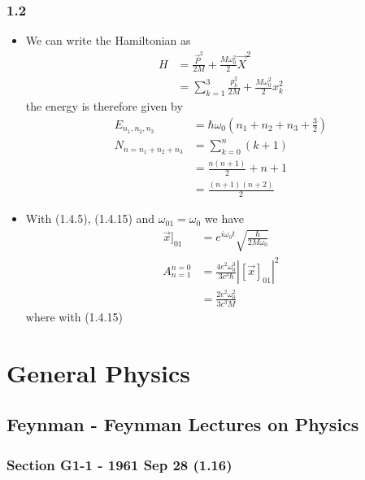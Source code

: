 \documentclass[10pt,a4paper]{article}
\theoremstyle{definition}
\begin{document}
\subsubsection{1.2}
\begin{itemize}
\item We can write the Hamiltonian as
\begin{align}
    H&=\frac{\vec{P}^2}{2M}+\frac{M\omega_0^2}{2}\vec{X}^2\\
    &=\sum_{k=1}^3\frac{p_k^2}{2M}+\frac{M\omega_0^2}{2}x_k^2
\end{align}
the energy is therefore given by
\begin{align}
    E_{n_1,n_2,n_3}&=\hbar\omega_0\left(n_1+n_2+n_3+\frac{3}{2}\right)\\
    N_{n=n_1+n_2+n_3}&=\sum_{k=0}^{n}(k+1)\\
    &=\frac{n(n+1)}{2}+n+1\\
    &=\frac{(n+1)(n+2)}{2}
\end{align}

\item With (1.4.5), (1.4.15) and $\omega_{01}=\omega_0$ we have
\begin{align}
    \vec{x}]_{01}&=e^{i\omega_0 t}\sqrt{\frac{\hbar}{2M\omega_0}}\\
    A_{n=1}^{n=0}&=\frac{4e^2\omega_0^3}{3c^3\hbar}\left|[\vec{x}]_{01}\right|^2\\
    &=\frac{2e^2\omega_0^2}{3c^3M}
\end{align}
where with (1.4.15)
\end{itemize}


\section{General Physics}

\subsection{{\sc Feynman} - Feynman Lectures on Physics}
\subsubsection{Section G1-1 - 1961 Sep 28 (1.16)}
\end{document}
